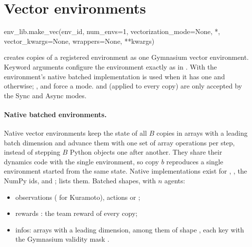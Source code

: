 \section{Vector environments}\label{sec:workflow-vector}

\begin{pycode}
env_lib.make_vec(env_id, num_envs=1, vectorization_mode=None, *,
                 vector_kwargs=None, wrappers=None, **kwargs)
\end{pycode}
creates  copies of a registered environment as one Gymnasium
vector environment. Keyword
arguments configure the environment exactly as in . With
 the environment's native batched implementation
is used when it has one and  otherwise;
,  and  force a mode.
 and  (applied to every copy) are only
accepted by the Sync and Async modes.

\paragraph{Native batched environments.} Native vector environments keep the
state of all $B$ copies in arrays with a leading batch dimension and advance
them with one set of array operations per step, instead of stepping $B$ Python
objects one after another. They share their dynamics code with the single
environment, so copy $b$ reproduces a single environment started from the same
state. Native implementations exist for ,
, the NumPy  ids,
 and ; 
lists them. Batched shapes, with $n$ agents:
\begin{itemize}
  \item observations  ( for Kuramoto),
        actions  or ;
  \item rewards : the team reward of every copy;
  \item infos: arrays with a leading  dimension, among them
         of shape , each key  with the
        Gymnasium validity mask .
\end{itemize}

